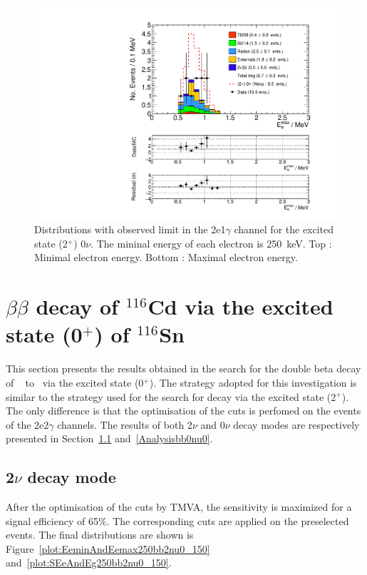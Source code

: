 \documentclass[main.tex]{subfiles}
\begin{document}
\begin{figure} [h!]
\begin{center}
\includegraphics[scale=0.36]{pictures/FinalResults/bb0nu2/150precut/Eemax_bb0nu2.pdf}
\end{center}
\caption{Distributions with observed limit in the 2e1$\gamma$ channel for the excited state (2$^+$) 0$\nu$. The mininal energy of each electron is 250~keV. Top : Minimal electron energy. Bottom : Maximal electron energy.}
\label{plot:SEeAndEg250bb0nu2Precut}
\end{figure}


\FloatBarrier


\section{$\beta\beta$ decay of $^{\text{116}}$Cd via the excited state (0$^+$) of $^{\text{116}}$Sn}\label{sec:Result0PLUS}


\NI This section presents the results obtained in the search for the double beta decay of \Cd ~ to \Sn ~via the excited state  (0$^+$). The strategy adopted for this investigation is similar to the strategy used for the search for decay via the excited state (2$^+$). The only difference is that the optimisation of the cuts is perfomed on the events of the 2e2$\gamma$ channels. The results of both 2$\nu$ and  0$\nu$ decay modes are respectively presented in Section~\ref{Analysisbb2nu0} and~\ref{Analysisbb0nu0}.


\subsection{2$\nu$ decay mode}\label{Analysisbb2nu0}


\NI After the optimisation of the cuts by TMVA, the sensitivity is maximized for a signal efficiency of 65\%. The corresponding cuts are applied on the preselected events. The final distributions are shown is Figure~\ref{plot:EeminAndEemax250bb2nu0_150} and~\ref{plot:SEeAndEg250bb2nu0_150}. 
\end{document}
